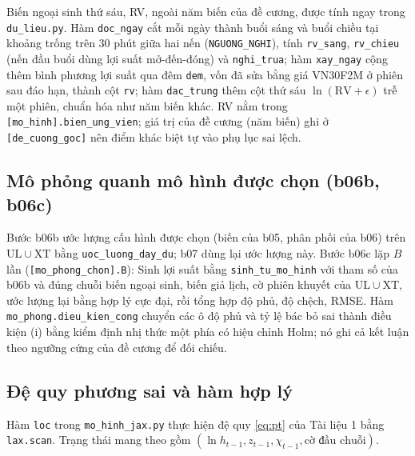 \documentclass[12pt,a4paper]{article}
\theoremstyle{remark}
\newcommand{\ma}[1]{\texttt{\small #1}}
\newcommand{\UL}{\mathrm{UL}}
\newcommand{\XT}{\mathrm{XT}}
\begin{document}
Biến ngoại sinh thứ sáu, RV, ngoài năm biến của đề cương, được tính ngay trong \ma{du\_lieu.py}. Hàm \ma{doc\_ngay} cắt mỗi ngày thành buổi sáng và buổi chiều tại khoảng trống trên $30$ phút giữa hai nến (\ma{NGUONG\_NGHI}), tính \ma{rv\_sang}, \ma{rv\_chieu} (nến đầu buổi dùng lợi suất mở-đến-đóng) và \ma{nghi\_trua}; hàm \ma{xay\_ngay} cộng thêm bình phương lợi suất qua đêm \ma{dem}, vốn đã sửa bằng giá VN30F2M ở phiên sau đáo hạn, thành cột \ma{rv}; hàm \ma{dac\_trung} thêm cột thứ sáu $\ln(\mathrm{RV}+\epsilon)$ trễ một phiên, chuẩn hóa như năm biến khác. RV nằm trong \ma{[mo\_hinh].bien\_ung\_vien}; giá trị của đề cương (năm biến) ghi ở \ma{[de\_cuong\_goc]} nên điểm khác biệt tự vào phụ lục sai lệch.

\subsection{Mô phỏng quanh mô hình được chọn (b06b, b06c)}

Bước b06b ước lượng cấu hình được chọn (biến của b05, phân phối của b06) trên $\UL\cup\XT$ bằng \ma{uoc\_luong\_day\_du}; b07 dùng lại ước lượng này. Bước b06c lặp $B$ lần (\ma{[mo\_phong\_chon].B}): Sinh lợi suất bằng \ma{sinh\_tu\_mo\_hinh} với tham số của b06b và đúng chuỗi biến ngoại sinh, biến giả lịch, cờ phiên khuyết của $\UL\cup\XT$, ước lượng lại bằng hợp lý cực đại, rồi tổng hợp độ phủ, độ chệch, RMSE. Hàm \ma{mo\_phong.dieu\_kien\_cong} chuyển các ô độ phủ và tỷ lệ bác bỏ sai thành điều kiện (i) bằng kiểm định nhị thức một phía có hiệu chỉnh Holm; nó ghi cả kết luận theo ngưỡng cứng của đề cương để đối chiếu.

\subsection{Đệ quy phương sai và hàm hợp lý}

Hàm \ma{loc} trong \ma{mo\_hinh\_jax.py} thực hiện đệ quy \eqref{eq:pt} của Tài liệu 1 bằng \ma{lax.scan}. Trạng thái mang theo gồm $(\ln h_{t-1}, z_{t-1}, \chi_{t-1}, \text{cờ đầu chuỗi})$.
\end{document}
